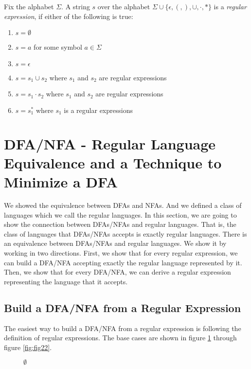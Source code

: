 \documentclass[11pt]{article}
\begin{document}
\begin{definition} \label{def:def19}
Fix the alphabet $\Sigma$. A string $s$ over the alphabet
$\Sigma \cup \{\epsilon,(,),\cup,\cdot,\ast\}$ is a \emph{regular
expression}, if either of the following is true:
\begin{enumerate}
\item $s = \emptyset$
\item $s = a$ for some symbol $a \in \Sigma$
\item $s = \epsilon$
\item $s = s_1 \cup s_2$ where $s_1$ and $s_2$ are regular
expressions
\item $s = s_1 \cdot s_2$ where $s_1$ and $s_2$ are regular
expressions
\item $s = s_1^\ast$ where $s_1$ is a regular expressions
\end{enumerate}
\end{definition}

\section{DFA/NFA - Regular Language Equivalence and a Technique to Minimize a DFA}

We showed the equivalence between DFAs and NFAs. And we defined a class of
languages which we call the regular languages. In this section, we are going
to show the connection between DFAs/NFAs and regular languages. That is, the
class of languages that DFAs/NFAs accepts is exactly regular languages. There
is an equivalence between DFAs/NFAs and regular languages. We show it by
working in two directions. First, we show that for every regular expression,
we can build a DFA/NFA accepting exactly the regular language represented by
it. Then, we show that for every DFA/NFA, we can derive a regular expression
representing the language that it accepts.

\subsection{Build a DFA/NFA from a Regular Expression}

The easiest way to build a DFA/NFA from a regular expression is following
the definition of regular expressions. The base cases are shown in figure
\ref{fig:fig20} through figure \ref{fig:fig22}.

\begin{figure}[ht]
    \centering
    \caption{$\emptyset$}
    \label{fig:fig20}
\end{figure}
\end{document}
